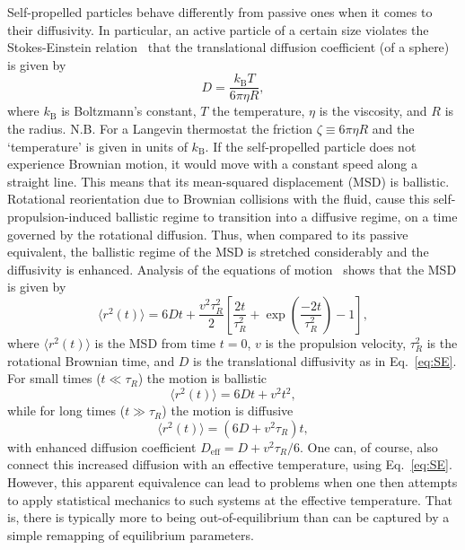 \documentclass[aip,jcp,reprint,a4paper,onecolumn,amsmath]{revtex4-1}
\begin{document}
Self-propelled particles behave differently from passive ones when it comes to their diffusivity. In particular, an active particle of a certain size violates the Stokes-Einstein relation~\cite{einstein06} that the translational diffusion coefficient (of a sphere) is given by 
\begin{equation}
\label{eq:SE} D = \frac{k_{\mathrm{B}}T}{6 \pi \eta R},
\end{equation}
where $k_{\mathrm{B}}$ is Boltzmann's constant, $T$ the temperature, $\eta$ is the viscosity, and $R$ is the radius. N.B. For a Langevin thermostat the friction $\zeta \equiv 6 \pi \eta R$ and the `temperature' is given in units of $k_{\mathrm{B}}$. If the self-propelled particle does not experience Brownian motion, it would move with a constant speed along a straight line. This means that its mean-squared displacement (MSD) is ballistic. Rotational reorientation due to Brownian collisions with the fluid, cause this self-propulsion-induced ballistic regime to transition into a diffusive regime, on a time governed by the rotational diffusion. Thus, when compared to its passive equivalent, the ballistic regime of the MSD is stretched considerably and the diffusivity is enhanced. Analysis of the equations of motion~\cite{Howse_07} shows that the MSD is given by 
\begin{equation}
\label{eq:emsd} \langle r^{2}(t) \rangle = 6 D t + \frac{v^{2} \tau^{2}_{R}}{2} \left[ \frac{2 t}{\tau^{2}_{R}} + \exp\left( \frac{-2t}{\tau^{2}_{R}} \right) - 1 \right],
\end{equation}
where $\langle r^{2}(t) \rangle$ is the MSD from time $t=0$, $v$ is the propulsion velocity, $\tau^{2}_{R}$ is the rotational Brownian time, and $D$ is the translational diffusivity as in Eq.~\eqref{eq:SE}. For small times ($t \ll \tau_{R}$) the motion is ballistic
\begin{equation}
\label{eq:bal} \langle r^{2}(t) \rangle = 6 D t + v^{2} t^{2},
\end{equation}
while for long times ($t \gg \tau_{R}$) the motion is diffusive
\begin{equation}
\label{eq:diff} \langle r^{2}(t) \rangle = (6 D + v^{2}\tau_{R}) t,
\end{equation}
with enhanced diffusion coefficient $D_{\mathrm{eff}} = D + v^{2}\tau_{R}/6$. One can, of course, also connect this increased diffusion with an effective temperature, using Eq.~\eqref{eq:SE}. However, this apparent equivalence can lead to problems when one then attempts to apply statistical mechanics to such systems at the effective temperature. That is, there is typically more to being out-of-equilibrium than can be captured by a simple remapping of equilibrium parameters.
\end{document}
